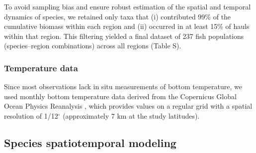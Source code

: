\documentclass[11pt]{article}
\begin{document}
\begin{spacing}{1.5}
To avoid sampling bias and ensure robust estimation of the spatial and temporal dynamics of species, we retained only taxa that (i) contributed 99\% of the cumulative biomass within each region and (ii) occurred in at least 15\% of hauls within that region. This filtering yielded a final dataset of 237 fish populations (species–region combinations) across all regions (Table S).


\subsubsection{Temperature data}

Since most observations lack in situ measurements of bottom temperature, we used monthly bottom temperature data derived from the Copernicus Global Ocean Physics Reanalysis \citep{european_union-copernicus_marine_service_global_2018}, which provides values on a regular grid with a spatial resolution of 1/12$^{\circ}$ (approximately 7 km at the study latitudes).


\subsection{Species spatiotemporal modeling}\label{sec:Species spatiotemporal modeling}


\end{spacing}
\end{document}
